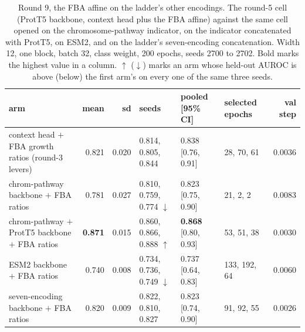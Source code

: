 \begin{table}[H]
  \centering
  \footnotesize
  \caption[Round 9, the FBA affine on the ladder's other encodings]{Round 9, the FBA affine on the ladder's other encodings. The round-5 cell (ProtT5 backbone, context head plus the FBA affine) against the same cell opened on the chromosome-pathway indicator, on the indicator concatenated with ProtT5, on ESM2, and on the ladder's seven-encoding concatenation. Width 12, one block, batch 32, class weight, 200 epochs, seeds 2700 to 2702. Bold marks the highest value in a column. $\uparrow$ ($\downarrow$) marks an arm whose held-out AUROC is above (below) the first arm's on every one of the same three seeds.}
  \label{tab:w20}
  \begin{tabular}{@{}p{52mm}rrlllr@{}}
    \hline
    arm & mean & sd & seeds & pooled [95\% CI] & selected epochs & val step \\
    \hline
    context head $+$ FBA growth ratios (round-3 levers) & 0.821 & 0.020 & 0.814, 0.805, 0.844 & 0.838 [0.76, 0.91] & 28, 70, 61 & 0.0036 \\
    chrom-pathway backbone $+$ FBA ratios & 0.781 & 0.027 & 0.810, 0.759, 0.774 $\downarrow$ & 0.823 [0.75, 0.90] & 21, 2, 2 & 0.0083 \\
    chrom-pathway $+$ ProtT5 backbone $+$ FBA ratios & \textbf{0.871} & 0.015 & 0.860, 0.866, 0.888 $\uparrow$ & \textbf{0.868} [0.80, 0.93] & 53, 51, 38 & 0.0030 \\
    ESM2 backbone $+$ FBA ratios & 0.740 & 0.008 & 0.734, 0.736, 0.749 $\downarrow$ & 0.737 [0.64, 0.83] & 133, 192, 64 & 0.0060 \\
    seven-encoding backbone $+$ FBA ratios & 0.820 & 0.009 & 0.822, 0.810, 0.827 & 0.823 [0.74, 0.90] & 91, 92, 55 & 0.0026 \\
    \hline
  \end{tabular}
\end{table}
